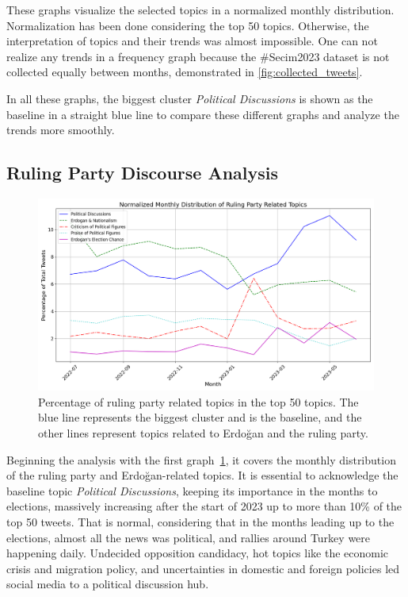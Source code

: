 These graphs visualize the selected topics in a normalized monthly distribution. 
Normalization has been done considering the top 50 topics. Otherwise, the interpretation of topics 
and their trends was almost impossible. One can not realize any trends in a frequency graph because 
the \#Secim2023 dataset is not collected equally between months, demonstrated in \autoref{fig:collected_tweets}.

In all these graphs, the biggest cluster \textit{Political Discussions} is shown as the baseline 
in a straight blue line to compare these different graphs and analyze the trends more smoothly. 

\subsection{Ruling Party Discourse Analysis}

\begin{figure}[htb]
    \centering
    \includegraphics[width=\linewidth]{figures/normalized_akp_selected_topics_distribution_with_styles.png}
    \caption[Normalized monthly distribution of ruling party related topics]
    {Percentage of ruling party related topics in the top 50 topics. 
    The blue line represents the biggest cluster and is the baseline, 
    and the other lines represent topics related to Erdoğan and the ruling party.}\label{fig:topics_graph_akp}
\end{figure}

Beginning the analysis with the first graph~\ref{fig:topics_graph_akp}, 
it covers the monthly distribution of the ruling party and Erdoğan-related topics. 
It is essential to acknowledge the baseline topic \textit{Political Discussions}, 
keeping its importance in the months to elections, massively increasing after the start of 2023 up 
to more than 10\% of the top 50 tweets. That is normal, considering that in the months leading up 
to the elections, almost all the news was political, and rallies around Turkey were happening daily. 
Undecided opposition candidacy, hot topics like the economic crisis and migration policy, and 
uncertainties in domestic and foreign policies led social media to a political discussion hub.

